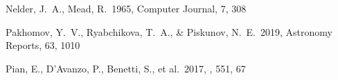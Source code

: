 \documentclass[twocolumn, twocolappendix]{aastex63}
\begin{document}
\begin{thebibliography}{}




 Nelder, J.~A., Mead, R.\ 1965, Computer Journal, 7, 308





 Pakhomov, Y.~V., Ryabchikova, T.~A., \& Piskunov, N.~E.\ 2019, Astronomy Reports, 63, 1010








 Pian, E., D'Avanzo, P., Benetti, S., et al.\ 2017, \nat, 551, 67














\end{thebibliography}
\end{document}
